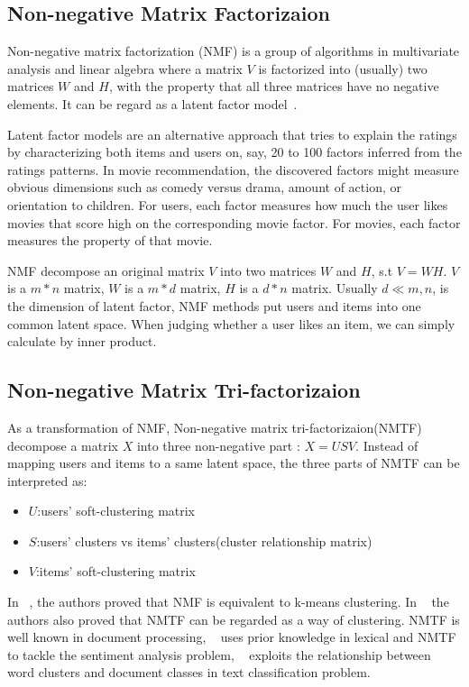 \hspace{0.05in}
\subsection{Non-negative Matrix Factorizaion}
Non-negative matrix factorization (NMF) is a group of algorithms in multivariate analysis and linear algebra where a matrix $V$ is factorized into (usually) two matrices $W$ and $H$, with the property that all three matrices have no negative elements. It can be regard as a latent factor model~\cite{/computer/yehuda09matrix}.

Latent factor models are an alternative approach that tries to explain the ratings by characterizing both items and users on, say, 20 to 100 factors inferred from the ratings patterns. In movie recommendation, the discovered factors might measure obvious dimensions such as comedy versus
drama, amount of action, or orientation to children. For users, each factor measures how much the user likes movies that score high on the corresponding movie factor. For movies, each factor measures the property of that movie.

NMF decompose an original matrix $V$ into two matrices $W$ and $H$, s.t $V = WH$. $V$ is a $m*n$ matrix, $W$ is a $m*d$ matrix, $H$ is a $d*n$ matrix. Usually $d \ll m,n$, is the dimension of latent factor, NMF methods put users and items into one common latent space. When judging whether a user likes an item, we can simply calculate by inner product.

\hspace{0.05in}
\subsection{Non-negative Matrix Tri-factorizaion}
As a transformation of NMF, Non-negative matrix tri-factorizaion(NMTF) decompose a matrix $X$ into three non-negative part : $X = USV$. Instead of mapping users and items to a same latent space, the three parts of NMTF can be interpreted as:
\begin{itemize}
\item $U$:users' soft-clustering matrix
\item $S$:users' clusters vs items' clusters(cluster relationship matrix)
\item $V$:items' soft-clustering matrix
\end{itemize}

In ~\cite{Ding05onthe}, the authors proved that NMF is equivalent to k-means clustering. In ~\cite{Ding06orthogonalnonnegative} the authors also proved that NMTF can be regarded as a way of clustering. NMTF is well known in document processing, ~\cite{Li:2009:NMT:1687878.1687914} uses prior knowledge in lexical and NMTF to tackle the sentiment analysis problem, ~\cite{Zhuang:2011:EAW:1952191.1952195} exploits the relationship between word clusters and document classes in text classification problem.

